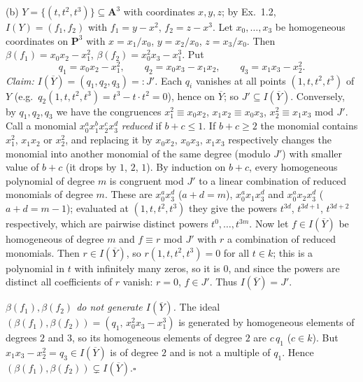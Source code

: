 \documentclass[11pt]{article}
\begin{document}
(b) $Y=\{(t,t^2,t^3)\}\subseteq\mathbf A^3$ with coordinates $x,y,z$; by Ex.~1.2, $I(Y)=(f_1,f_2)$ with $f_1=y-x^2$, $f_2=z-x^3$. Let $x_0,\dots,x_3$ be homogeneous coordinates on $\mathbf P^3$ with $x=x_1/x_0$, $y=x_2/x_0$, $z=x_3/x_0$. Then $\beta(f_1)=x_0x_2-x_1^2$, $\beta(f_2)=x_0^2x_3-x_1^3$. Put
\[
q_1=x_0x_2-x_1^2,\qquad q_2=x_0x_3-x_1x_2,\qquad q_3=x_1x_3-x_2^2 .
\]
\emph{Claim: $I(\overline Y)=(q_1,q_2,q_3)=:J'$.} Each $q_i$ vanishes at all points $(1,t,t^2,t^3)$ of $Y$ (e.g.\ $q_2(1,t,t^2,t^3)=t^3-t\cdot t^2=0$), hence on $\overline Y$; so $J'\subseteq I(\overline Y)$. Conversely, by $q_1,q_2,q_3$ we have the congruences $x_1^2\equiv x_0x_2$, $x_1x_2\equiv x_0x_3$, $x_2^2\equiv x_1x_3$ mod $J'$. Call a monomial $x_0^ax_1^bx_2^cx_3^d$ \emph{reduced} if $b+c\le1$. If $b+c\ge2$ the monomial contains $x_1^2$, $x_1x_2$ or $x_2^2$, and replacing it by $x_0x_2$, $x_0x_3$, $x_1x_3$ respectively changes the monomial into another monomial of the same degree (modulo $J'$) with smaller value of $b+c$ (it drops by $1$, $2$, $1$). By induction on $b+c$, every homogeneous polynomial of degree $m$ is congruent mod $J'$ to a linear combination of reduced monomials of degree $m$. These are $x_0^ax_3^d$ ($a+d=m$), $x_0^ax_1x_3^d$ and $x_0^ax_2x_3^d$ ($a+d=m-1$); evaluated at $(1,t,t^2,t^3)$ they give the powers $t^{3d}$, $t^{3d+1}$, $t^{3d+2}$ respectively, which are pairwise distinct powers $t^0,\dots,t^{3m}$. Now let $f\in I(\overline Y)$ be homogeneous of degree $m$ and $f\equiv r$ mod $J'$ with $r$ a combination of reduced monomials. Then $r\in I(\overline Y)$, so $r(1,t,t^2,t^3)=0$ for all $t\in k$; this is a polynomial in $t$ with infinitely many zeros, so it is $0$, and since the powers are distinct all coefficients of $r$ vanish: $r=0$, $f\in J'$. Thus $I(\overline Y)=J'$.

\emph{$\beta(f_1),\beta(f_2)$ do not generate $I(\overline Y)$.} The ideal $(\beta(f_1),\beta(f_2))=(q_1,\,x_0^2x_3-x_1^3)$ is generated by homogeneous elements of degrees $2$ and $3$, so its homogeneous elements of degree $2$ are $c\,q_1$ ($c\in k$). But $x_1x_3-x_2^2=q_3\in I(\overline Y)$ is of degree $2$ and is not a multiple of $q_1$. Hence $(\beta(f_1),\beta(f_2))\subsetneq I(\overline Y)$.\hfill$\square$
\end{document}
